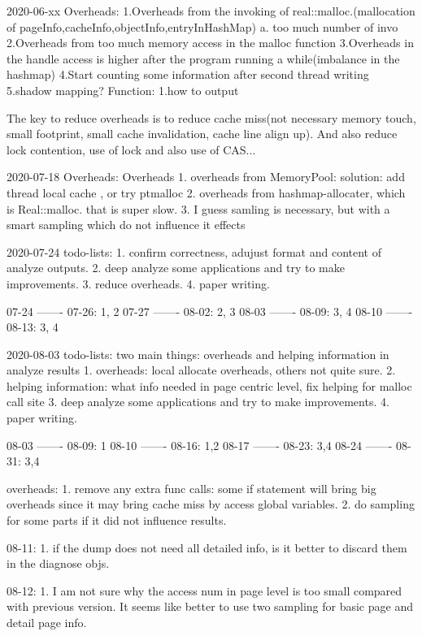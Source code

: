 2020-06-xx
Overheads:
1.Overheads from the invoking of real::malloc.(mallocation of pageInfo,cacheInfo,objectInfo,entryInHashMap)
a. too much number of invo
2.Overheads from too much memory access in the malloc function
3.Overheads in the handle access is higher after the program running a while(imbalance in the hashmap)
4.Start counting some information after second thread writing
5.shadow mapping?
Function:
1.how to output

The key to reduce overheads is to reduce cache miss(not necessary memory touch, small footprint, small cache invalidation, cache line align up).
And also reduce lock contention, use of lock and also use of CAS...


2020-07-18 Overheads:
Overheads
1. overheads from MemoryPool:
solution: add thread local cache , or try ptmalloc
2. overheads from hashmap-allocater, which is Real::malloc. that is super slow.
3. I guess samling is necessary, but with a smart sampling which do not influence it effects




2020-07-24 todo-lists:
1. confirm correctness, adujust format and content of analyze outputs.
2. deep analyze some applications and try to make improvements.
3. reduce overheads.
4. paper writing.

07-24 ------- 07-26: 1, 2
07-27 ------- 08-02: 2, 3
08-03 ------- 08-09: 3, 4
08-10 ------- 08-13: 3, 4

2020-08-03 todo-lists:
two main things: overheads and helping information in analyze results
    1. overheads: local allocate overheads, others not quite sure.
    2. helping information: what info needed in page centric level, fix helping for malloc call site
    3. deep analyze some applications and try to make improvements.
    4. paper writing.

08-03 ------- 08-09: 1
08-10 ------- 08-16: 1,2
08-17 ------- 08-23: 3,4
08-24 ------- 08-31: 3,4


overheads:
    1. remove any extra func calls: some if statement will bring big overheads since it may bring cache miss by access global variables.
    2. do sampling for some parts if it did not influence results.


08-11:
    1. if the dump does not need all detailed info, is it better to discard them in the diagnose objs.

08-12:
    1. I am not sure why the access num in page level is too small compared with previous version. It seems like better to use two
sampling for basic page and detail page info.